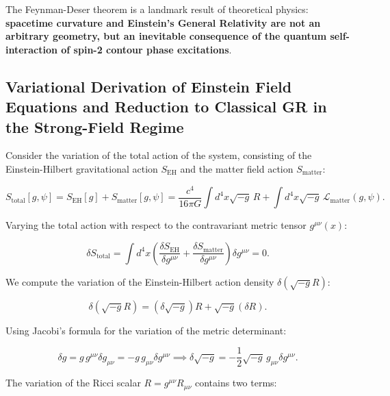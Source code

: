 The Feynman-Deser theorem is a landmark result of theoretical physics: \textbf{spacetime curvature and Einstein's General Relativity are not an arbitrary geometry, but an inevitable consequence of the quantum self-interaction of spin-2 contour phase excitations}.

\subsection{Variational Derivation of Einstein Field Equations and Reduction to Classical GR in the Strong-Field Regime}\label{sec:2.2}

Consider the variation of the total action of the system, consisting of the Einstein-Hilbert gravitational action $S_{\text{EH}}$ and the matter field action $S_{\text{matter}}$:

\begin{equation}\label{eq:2.15}\tag{2.15}
S_{\text{total}}[g, \psi] = S_{\text{EH}}[g] + S_{\text{matter}}[g, \psi] = \frac{c^4}{16\pi G} \int d^4x \sqrt{-g} \, R + \int d^4x \sqrt{-g} \, \mathcal{L}_{\text{matter}}(g, \psi).
\end{equation}

Varying the total action with respect to the contravariant metric tensor $g^{\mu\nu}(x)$:

\begin{equation}\label{eq:2.16}\tag{2.16}
\delta S_{\text{total}} = \int d^4x \left( \frac{\delta S_{\text{EH}}}{\delta g^{\mu\nu}} + \frac{\delta S_{\text{matter}}}{\delta g^{\mu\nu}} \right) \delta g^{\mu\nu} = 0.
\end{equation}

We compute the variation of the Einstein-Hilbert action density $\delta(\sqrt{-g} R)$:

\begin{equation}\label{eq:2.17}\tag{2.17}
\delta(\sqrt{-g} R) = (\delta\sqrt{-g}) R + \sqrt{-g} (\delta R).
\end{equation}

Using Jacobi's formula for the variation of the metric determinant:

\begin{equation}\label{eq:2.18}\tag{2.18}
\delta g = g \, g^{\mu\nu} \delta g_{\mu\nu} = -g \, g_{\mu\nu} \delta g^{\mu\nu} \implies \delta\sqrt{-g} = -\frac{1}{2}\sqrt{-g} \, g_{\mu\nu} \delta g^{\mu\nu}.
\end{equation}

The variation of the Ricci scalar $R = g^{\mu\nu} R_{\mu\nu}$ contains two terms:

